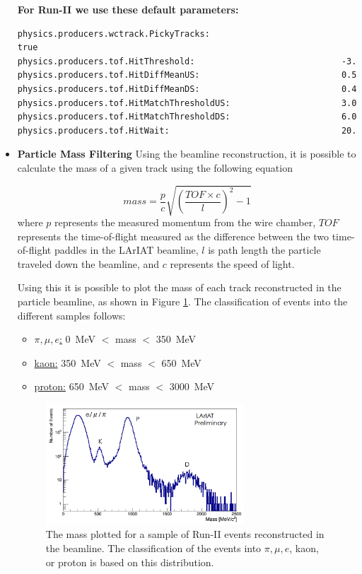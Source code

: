 \begin{itemize}
\textbf{For Run-II we use these default parameters:}
\begin{verbatim} 
physics.producers.wctrack.PickyTracks:                          true
physics.producers.tof.HitThreshold:                             -3.
physics.producers.tof.HitDiffMeanUS:                            0.5  
physics.producers.tof.HitDiffMeanDS:                            0.4  
physics.producers.tof.HitMatchThresholdUS:                      3.0  
physics.producers.tof.HitMatchThresholdDS:                      6.0  
physics.producers.tof.HitWait:                                  20.
\end{verbatim}

\item \textbf{Particle Mass Filtering}
Using the beamline reconstruction, it is possible to calculate the mass of a given track using the following equation

\begin{equation}
mass = \frac{p}{c}\sqrt{(\frac{TOF \times c}{l})^2 -1}
\end{equation}
where $p$ represents the measured momentum from the wire chamber, $TOF$ represents the time-of-flight measured as the difference between the two time-of-flight paddles in the LArIAT beamline, $l$ is path length the particle traveled down the beamline, and $c$ represents the speed of light.

Using this it is possible to plot the mass of each track reconstructed in the particle beamline, as shown in Figure \ref{fig:mass}. The classification of events into the different samples follows:

\begin{itemize}
\item \underline{$\pi, \mu, e$:} 0~MeV $<$ mass $<$ 350~MeV

\item \underline{kaon:} 350~MeV $<$ mass $<$ 650~MeV

\item \underline{proton:} 650~MeV $<$ mass $<$ 3000~MeV

\end{itemize}

\begin{figure}[htb]
\centering
\includegraphics[width=0.70\textwidth]{images/mass.png}
\caption{The mass plotted for a sample of Run-II events reconstructed in the beamline. The classification of the events into $\pi, \mu, e$, kaon, or proton is based on this distribution.}
\label{fig:mass}
\end{figure}


\end{itemize}
